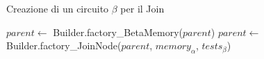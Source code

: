 
\begin{algorithm}
\caption{Creazione di un circuito $\beta$ per il Join}\label{alg:builder-makeJoin}
\begin{algorithmic}
\State $parent\gets$ Builder.factory\_BetaMemory($parent$)
\State $parent\gets$ Builder.factory\_JoinNode($parent$, $memory_\alpha$, $tests_\beta$)
\State {}
\EndFunction
\end{algorithmic}
\end{algorithm}

